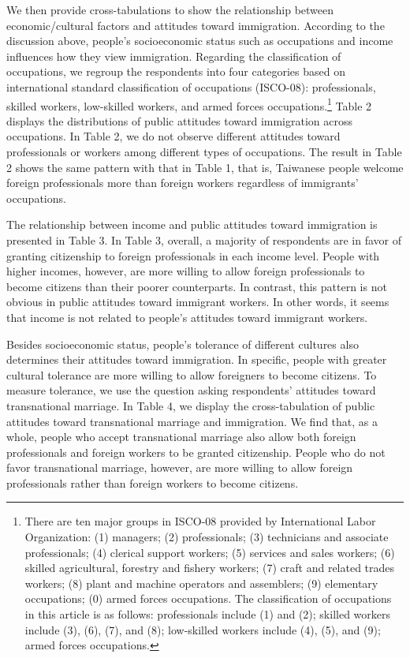 \documentclass[12pt]{article}
\begin{document}
We then provide cross-tabulations to show the relationship between economic/cultural factors and attitudes toward immigration. According to the discussion above, people's socioeconomic status such as occupations and income influences how they view immigration. Regarding the classification of occupations, we regroup the respondents into four categories based on international standard classification of occupations (ISCO-08): professionals, skilled workers, low-skilled workers, and armed forces occupations.\footnote{There are ten major groups in ISCO-08 provided by International Labor Organization: (1) managers; (2) professionals; (3) technicians and associate professionals; (4) clerical support workers; (5) services and sales workers; (6) skilled agricultural, forestry and fishery workers; (7) craft and related trades workers; (8) plant and machine operators and assemblers; (9) elementary occupations; (0) armed forces occupations. The classification of occupations in this article is as follows: professionals include (1) and (2); skilled workers include (3), (6), (7), and (8); low-skilled workers include (4), (5), and (9); armed forces occupations.} Table 2 displays the distributions of public attitudes toward immigration across occupations. In Table 2, we do not observe different attitudes toward professionals or workers among different types of occupations. The result in Table 2 shows the same pattern with that in Table 1, that is, Taiwanese people welcome foreign professionals more than foreign workers regardless of immigrants' occupations.


The relationship between income and public attitudes toward immigration is presented in Table 3. In Table 3, overall, a majority of respondents are in favor of granting citizenship to foreign professionals in each income level. People with higher incomes, however, are more willing to allow foreign professionals to become citizens than their poorer counterparts. In contrast, this pattern is not obvious in public attitudes toward immigrant workers. In other words, it seems that income is not related to people's attitudes toward immigrant workers.


Besides socioeconomic status, people's tolerance of different cultures also determines their attitudes toward immigration. In specific, people with greater cultural tolerance are more willing to allow foreigners to become citizens. To measure tolerance, we use the question asking respondents' attitudes toward transnational marriage. In Table 4, we display the cross-tabulation of public attitudes toward transnational marriage and immigration. We find that, as a whole, people who accept transnational marriage also allow both foreign professionals and foreign workers to be granted citizenship. People who do not favor transnational marriage, however, are more willing to allow foreign professionals rather than foreign workers to become citizens.
\end{document}
